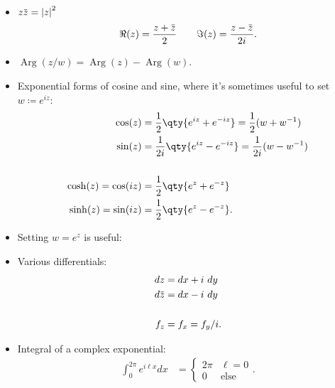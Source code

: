 \begin{fact}

\envlist

\begin{itemize}
\item
  \(z\mkern 1.5mu\overline{\mkern-1.5muz\mkern-1.5mu}\mkern 1.5mu = {\left\lvert {z} \right\rvert}^2\)
  \begin{align*}
  \Re(z) = { z + \mkern 1.5mu\overline{\mkern-1.5muz\mkern-1.5mu}\mkern 1.5mu \over 2} && && 
  \Im(z) = {z - \mkern 1.5mu\overline{\mkern-1.5muz\mkern-1.5mu}\mkern 1.5mu \over 2i}
  .\end{align*}
\item
  \(\operatorname{Arg}(z/w) = \operatorname{Arg}(z) - \operatorname{Arg}(w)\).
\item
  Exponential forms of cosine and sine, where it's sometimes useful to
  set \(w\coloneqq e^{iz}\):
  \begin{align*}
  \cos(z) 
  &= \frac 1 2 \qty{e^{iz} + e^{-iz}} = {1\over 2}(w+ w^{-1})\\
  \sin(z) 
  &= \frac{1}{2i}\qty{e^{iz} - e^{-iz}} = {1\over 2i}(w-w^{-1})
  \\ \\
  \cosh(z) = \cos(iz) 
  &= {1\over 2}\qty{e^z + e^{-z}} \\
  \sinh(z) = \sin(iz) 
  &= {1\over 2}\qty{e^z - e^{-z}} 
  .\end{align*}
\item
  Setting \(w=e^z\) is useful:
\item
  Various differentials:
  \begin{align*}
  dz &= dx + i~dy \\
  d\mkern 1.5mu\overline{\mkern-1.5muz\mkern-1.5mu}\mkern 1.5mu &= dx - i~dy \\ \\
  f_z &= f_x = f_y / i
  .\end{align*}
\item
  Integral of a complex exponential:
  \begin{align*}
  \int_{0}^{2 \pi} e^{i \ell x} d x
  &=\left\{\begin{array}{ll}
  {2 \pi} & {\ell=0} \\ 
  {0} & \text{else}
  \end{array}\right.
  .\end{align*}
\end{itemize}

\end{fact}


